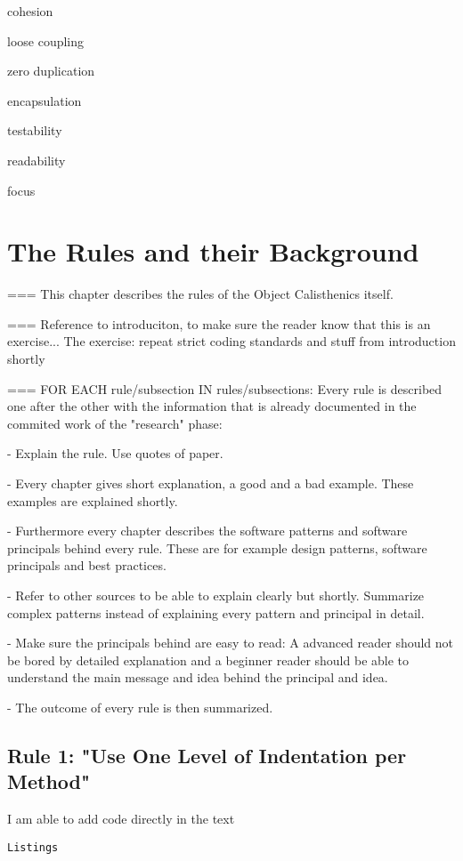 cohesion

loose coupling

zero duplication

encapsulation

testability

readability

focus


\section{The Rules and their Background}
=== This chapter describes the rules of the Object Calisthenics itself. 

=== Reference to introduciton, to make sure the reader know that this is an exercise... The exercise: repeat strict coding standards and stuff from introduction shortly


=== FOR EACH rule/subsection IN rules/subsections: 
Every rule is described one after the other with the information that is already documented in the commited work of the "research" phase: 

 - Explain the rule. Use quotes of paper. 
 
 - Every chapter gives short explanation, a good and a bad example. These examples are explained shortly. 
 
 -  Furthermore every chapter describes the software patterns and software principals behind every rule. These are for example design patterns, software principals and best practices. 
 
 - Refer to other sources to be able to explain clearly but shortly. Summarize complex patterns instead of explaining every pattern and principal in detail. 
 
 - Make sure the principals behind are easy to read: A advanced reader should not be bored by detailed explanation and a beginner reader should be able to understand the main message and idea behind the principal and idea.
 
 - The outcome of every rule is then summarized.

\subsection{Rule 1: "Use One Level of Indentation per Method"}
I am able to add code directly in the text 

\begin{lstlisting}
Listings
\end{lstlisting}


